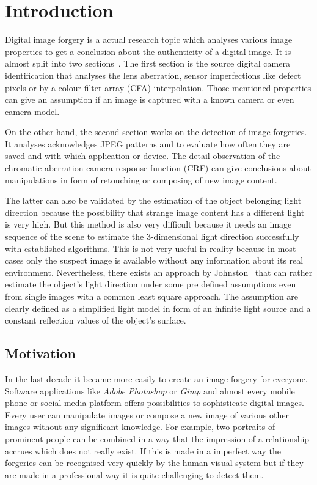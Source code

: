 \section{Introduction}\label{sec:Introduction}
Digital image forgery is a actual research topic which analyses various image properties to get a conclusion about the authenticity of a digital image. It is almost split into two sections~\cite{4284575}. The first section is the source digital camera identification that analyses the lens aberration, sensor imperfections like defect pixels or by a colour filter array (CFA) interpolation. Those mentioned properties can give an assumption if an image is captured with a known camera or even camera model.

On the other hand, the second section works on the detection of image forgeries. It analyses acknowledges JPEG patterns and to evaluate how often they are saved and with which application or device. The detail observation of the chromatic aberration camera response function (CRF) can give conclusions about manipulations in form of retouching or composing of new image content. 

The latter can also be validated by the estimation of the object belonging light direction because the possibility that strange image content has a different light is very high. But this method is also very difficult because it needs an image sequence of the scene to estimate the 3-dimensional light direction successfully with established algorithms. This is not very useful in reality because in most cases only the suspect image is available without any information about its real environment. Nevertheless, there exists an approach by Johnston~\cite{Johnson} that can rather estimate the object's light direction under some pre defined assumptions even from single images with a common least square approach. The assumption are clearly defined as a simplified light model in form of an infinite light source and a constant reflection values of the object's surface.

\subsection{Motivation}\label{sec:Motivation}
In the last decade it became more easily to create an image forgery for everyone. Software applications like \textit{Adobe Photoshop} or \textit{Gimp} and almost every mobile phone or social media platform offers possibilities to sophisticate digital images. Every user can manipulate images or compose a new image of various other images without any significant knowledge. For example, two portraits of prominent people can be combined in a way that the impression of a relationship accrues which does not really exist. If this is made in a imperfect way the forgeries can be recognised very quickly by the human visual system but if they are made in a professional way it is quite challenging to detect them. 

